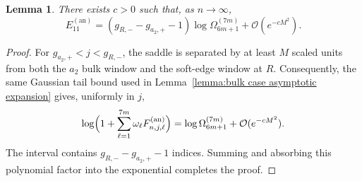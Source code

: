 \documentclass[a4paper]{article}
\newtheorem{lemma}[theorem]{Lemma}
\newcommand{\erfc}{{\rm erfc}}
\numberwithin{equation}{section}
\begin{document}
\begin{lemma}\label{lemma:asymptotic expansion E11 annulus}
\label{lemma:asymptotics of E11 counting annulus}
There exists $c>0$ such that, as $n\to\infty$,
\[
E_{11}^{(\mathrm{an})}
=
(g_{R,-}-g_{a_2,+}-1)\log\Omega_{6m+1}^{(7m)}+\mathcal{O}(e^{-cM^2}).
\]

\end{lemma}

\begin{proof}
For $g_{a_2,+}<j<g_{R,-}$, the saddle is separated by at least $M$ scaled
units from both the $a_2$ bulk window and the soft-edge window at $R$.
Consequently, the same Gaussian tail bound used in
Lemma~\ref{lemma:bulk case asymptotic expansion} gives, uniformly in $j$,
\[
\log\Bigl(1+\sum_{\ell=1}^{7m}\omega_\ell
F_{n,j,\ell}^{(\mathrm{an})}\Bigr)
=\log\Omega_{6m+1}^{(7m)}+\mathcal O(e^{-cM^2}).
\]
The interval contains $g_{R,-}-g_{a_2,+}-1$ indices.  Summing and absorbing
this polynomial factor into the exponential completes the proof.
\end{proof}

\end{document}
